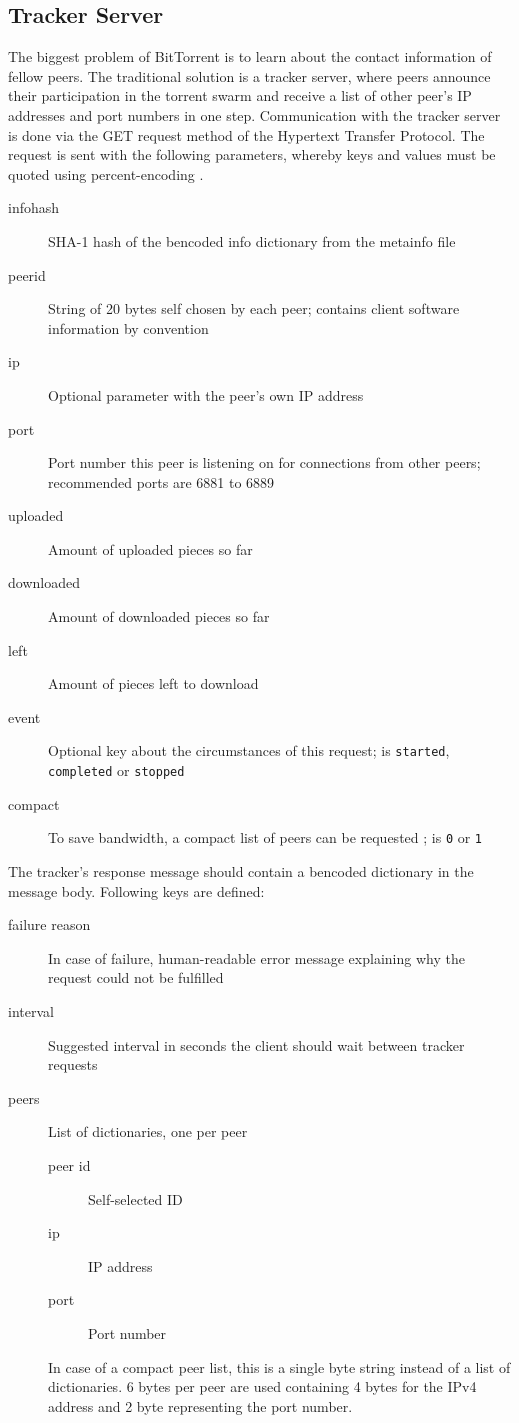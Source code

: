 \documentclass[10pt, a4paper, twoside, headsepline]{scrbook}
\renewcommand{\_}{\origunderscore\allowbreak}
\begin{document}
\subsection{Tracker Server}
The biggest problem of BitTorrent is to learn about the contact information of fellow peers. The traditional solution is a tracker server, where peers announce their participation in the torrent swarm and receive a list of other peer's IP addresses and port numbers in one step. Communication with the tracker server is done via the GET request method of the Hypertext Transfer Protocol. The request is sent with the following parameters, whereby keys and values must be quoted using percent-encoding \cite[§~2.1]{percent}.

\begin{description}
  \item[info\_hash] SHA-1 hash of the bencoded info dictionary from the metainfo file
  \item[peer\_id] String of 20 bytes self chosen by each peer; contains client software information by convention
  \item[ip] Optional parameter with the peer's own IP address
  \item[port] Port number this peer is listening on for connections from other peers; recommended ports are 6881 to 6889
  \item[uploaded] Amount of uploaded pieces so far
  \item[downloaded] Amount of downloaded pieces so far
  \item[left] Amount of pieces left to download
  \item[event] Optional key about the circumstances of this request; is \texttt{started}, \texttt{completed} or \texttt{stopped}
  \item[compact] To save bandwidth, a compact list of peers can be requested \cite{bep23}; is \texttt{0} or \texttt{1}
\end{description}

The tracker's response message should contain a bencoded dictionary in the message body. Following keys are defined:

\begin{description}
  \item[failure reason] In case of failure, human-readable error message explaining why the request could not be fulfilled
  \item[interval] Suggested interval in seconds the client should wait between tracker requests
  \item[peers] List of dictionaries, one per peer
  \begin{description}
    \item[peer id] Self-selected ID
    \item[ip] IP address
    \item[port] Port number
  \end{description}

  In case of a compact peer list, this is a single byte string instead of a list of dictionaries. 6 bytes per peer are used containing 4 bytes for the IPv4 address and 2 byte representing the port number.
\end{description}
\end{document}
